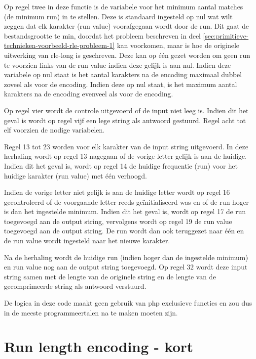 Op regel twee in deze functie is de variabele voor het minimum aantal matches (de minimum run) in te stellen. Deze is standaard ingesteld op nul wat wilt zeggen dat elk karakter (run value) voorafgegaan wordt door de run. Dit gaat de bestandsgrootte te min, doordat het probleem beschreven in deel \ref{sec:primitieve-technieken-voorbeeld-rle-probleem-1} kan voorkomen, maar is hoe de originele uitwerking van \gls{rle-long} is geschreven. Deze kan op één gezet worden om geen run te voorzien links van de run value indien deze gelijk is aan nul. Indien deze variabele op nul staat is het aantal karakters na de \gls{encoding} maximaal dubbel zoveel als voor de \gls{encoding}. Indien deze op nul staat, is het maximum aantal karakters na de \gls{encoding} evenveel als voor de \gls{encoding}.

Op regel vier wordt de controle uitgevoerd of de input niet leeg is. Indien dit het geval is wordt op regel vijf een lege \gls{string} als antwoord gestuurd. Regel acht tot elf voorzien de nodige variabelen.

Regel 13 tot 23 worden voor elk karakter van de input \gls{string} uitgevoerd. In deze herhaling wordt op regel 13 nagegaan of de vorige letter gelijk is aan de huidige. Indien dit het geval is, wordt op regel 14 de huidige frequentie (run) voor het huidige karakter (run value) met één verhoogd. 

Indien de vorige letter niet gelijk is aan de huidige letter wordt op regel 16 gecontroleerd of de voorgaande letter reeds geïnitialiseerd was en of de run hoger is dan het ingestelde minimum. Indien dit het geval is, wordt op regel 17 de run toegevoegd aan de output \gls{string}, vervolgens wordt op regel 19 de run value toegevoegd aan de output \gls{string}. De run wordt dan ook teruggezet naar één en de run value wordt ingesteld naar het nieuwe karakter.

Na de herhaling wordt de huidige run (indien hoger dan de ingestelde minimum) en run value nog aan de output \gls{string} toegevoegd. Op regel 32 wordt deze input \gls{string} samen met de lengte van de originele \gls{string} en de lengte van de gecomprimeerde \gls{string} als antwoord verstuurd.

De logica in deze code maakt geen gebruik van \gls{php} exclusieve functies en zou dus in de meeste programmeertalen na te maken moeten zijn.


\section{Run length encoding - kort}
\label{sec:compressietool-rle}

